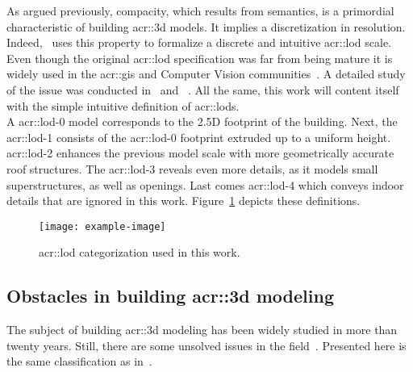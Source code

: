             As argued previously, compacity, which results from semantics, is a primordial characteristic of building \gls{acr::3d} models.
            It implies a discretization in resolution.
            Indeed,~\textcite{groger2012citygml} uses this property to formalize a discrete and intuitive \gls{acr::lod} scale.
            Even though the original \gls{acr::lod} specification was far from being mature it is widely used in the \gls{acr::gis} and Computer Vision communities~\parencite{biljecki2014formalisation, rau2006lod}.
            A detailed study of the issue was conducted in~\textcite{biljecki2014formalisation} and ~\textcite{biljecki2016improved}.
            All the same, this work will content itself with the simple intuitive definition of \glspl{acr::lod}.\\
            A \gls*{acr::lod}-0 model corresponds to the 2.5D footprint of the building.
            Next, the \gls*{acr::lod}-1 consists of the \gls*{acr::lod}-0 footprint extruded up to a uniform height.
            \gls*{acr::lod}-2 enhances the previous model scale with more geometrically accurate roof structures.
            The \gls*{acr::lod}-3 reveals even more details, as it models small superstructures, as well as openings.
            Last comes \gls*{acr::lod}-4 which conveys indoor details that are ignored in this work.
            Figure~\ref{fig::lods} depicts these definitions.\\

            \begin{figure}[htpb]
                \centering
                \texttt{[image: example-image]}            
                \caption{
                    \label{fig::lods} \gls{acr::lod} categorization used in this work.
                }
            \end{figure}
    \subsection{Obstacles in building \gls*{acr::3d} modeling}
        \label{subsec::introduction::urban_3d_reconstruction::challenges}
        The subject of building \gls{acr::3d} modeling has been widely studied in more than twenty years.
        Still, there are some unsolved issues in the field~\parencite{musialski2013survey, lafarge2015some}.
        Presented here is the same classification as in~\textcite{lafarge2015some}.

